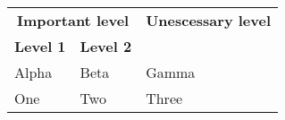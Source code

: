 
\usepackage{booktabs}

\begin{tabular}{@{}*3l@{}}
    \toprule[1.5pt]
    \multicolumn{2}{c}{\bfseries Important level} & 
    \multicolumn{1}{c}{\bfseries Unescessary level}\\
    \bfseries Level 1 & \bfseries Level 2 & \\
    \cmidrule(r){1-2}\cmidrule(l){3-3}
    Alpha & Beta & Gamma \\
    One & Two & Three\\
    \bottomrule[1.5pt]
\end{tabular}
